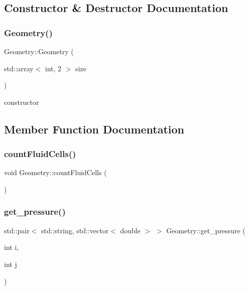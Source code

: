 \subsection{Constructor \& Destructor Documentation}
\mbox{\label{classGeometry_a2358c8ad5041aab45ba8609dd7a1859d}} 
\subsubsection{\texorpdfstring{Geometry()}{Geometry()}}
{\footnotesize\ttfamily Geometry\+::\+Geometry (\begin{DoxyParamCaption}\item[{std\+::array$<$ int, 2 $>$}]{size }\end{DoxyParamCaption})}



constructor 



\subsection{Member Function Documentation}
\mbox{\label{classGeometry_a1b0d4d7e3a31cc1e63d44ae2577840d5}} 
\subsubsection{\texorpdfstring{countFluidCells()}{countFluidCells()}}
{\footnotesize\ttfamily void Geometry\+::count\+Fluid\+Cells (\begin{DoxyParamCaption}{ }\end{DoxyParamCaption})}

\mbox{\label{classGeometry_a011241cbbb7288e496b2f68ff8818e3c}} 
\subsubsection{\texorpdfstring{get\_pressure()}{get\_pressure()}}
{\footnotesize\ttfamily std\+::pair$<$ std\+::string, std\+::vector$<$ double $>$ $>$ Geometry\+::get\+\_\+pressure (\begin{DoxyParamCaption}\item[{int}]{i,  }\item[{int}]{j }\end{DoxyParamCaption})}

